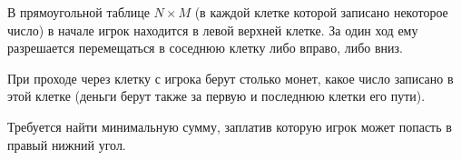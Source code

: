 В прямоугольной таблице $N \times M$ (в каждой клетке которой 
записано некоторое
число) в начале игрок находится в левой верхней клетке. 
За один ход ему
разрешается перемещаться в соседнюю клетку либо вправо, 
либо вниз.

При проходе через клетку с
игрока берут столько монет, какое число записано в 
этой клетке (деньги
берут также за первую и последнюю клетки его пути).

Требуется найти минимальную сумму, заплатив которую 
игрок может попасть в правый нижний угол.
